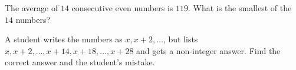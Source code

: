 The average of $14$ consecutive even numbers is $119$. What is the smallest of the $14$ numbers?

A student writes the numbers as $x,x+2,\dots$, but lists $x,x+2,\dots,x+14,x+18,\dots,x+28$ and gets a non-integer answer. Find the correct answer and the student's mistake.
